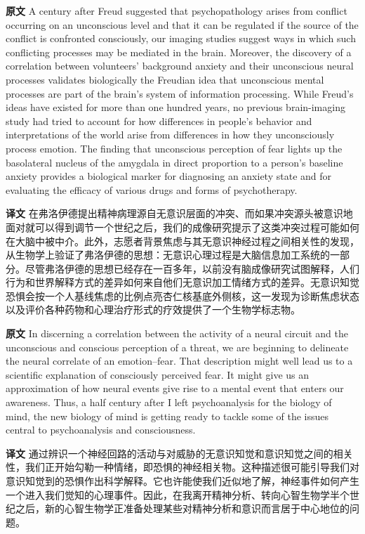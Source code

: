 \documentclass[UTF8]{ctexart}
\newenvironment{english}{\par\small\noindent\textbf{原文}\quad\ignorespaces}{\par}
\newenvironment{zhtranslation}{\par\noindent\textbf{译文}\quad\ignorespaces}{\par\vspace{0.35em}}
\begin{document}
\begin{english}
A century after Freud suggested that psychopathology arises from conflict occurring on an unconscious level and that it can be regulated if the source of the conflict is confronted consciously, our imaging studies suggest ways in which such conflicting processes may be mediated in the brain. Moreover, the discovery of a correlation between volunteers' background anxiety and their unconscious neural processes validates biologically the Freudian idea that unconscious mental processes are part of the brain's system of information processing. While Freud's ideas have existed for more than one hundred years, no previous brain-imaging study had tried to account for how differences in people's behavior and interpretations of the world arise from differences in how they unconsciously process emotion. The finding that unconscious perception of fear lights up the basolateral nucleus of the amygdala in direct proportion to a person's baseline anxiety provides a biological marker for diagnosing an anxiety state and for evaluating the efficacy of various drugs and forms of psychotherapy.
\end{english}
\begin{zhtranslation}
在弗洛伊德提出精神病理源自无意识层面的冲突、而如果冲突源头被意识地面对就可以得到调节一个世纪之后，我们的成像研究提示了这类冲突过程可能如何在大脑中被中介。此外，志愿者背景焦虑与其无意识神经过程之间相关性的发现，从生物学上验证了弗洛伊德的思想：无意识心理过程是大脑信息加工系统的一部分。尽管弗洛伊德的思想已经存在一百多年，以前没有脑成像研究试图解释，人们行为和世界解释方式的差异如何来自他们无意识加工情绪方式的差异。无意识知觉恐惧会按一个人基线焦虑的比例点亮杏仁核基底外侧核，这一发现为诊断焦虑状态以及评价各种药物和心理治疗形式的疗效提供了一个生物学标志物。\end{zhtranslation}

\begin{english}
In discerning a correlation between the activity of a neural circuit and the unconscious and conscious perception of a threat, we are beginning to delineate the neural correlate of an emotion--fear. That description might well lead us to a scientific explanation of consciously perceived fear. It might give us an approximation of how neural events give rise to a mental event that enters our awareness. Thus, a half century after I left psychoanalysis for the biology of mind, the new biology of mind is getting ready to tackle some of the issues central to psychoanalysis and consciousness.
\end{english}
\begin{zhtranslation}
通过辨识一个神经回路的活动与对威胁的无意识知觉和意识知觉之间的相关性，我们正开始勾勒一种情绪，即恐惧的神经相关物。这种描述很可能引导我们对意识知觉到的恐惧作出科学解释。它也许能使我们近似地了解，神经事件如何产生一个进入我们觉知的心理事件。因此，在我离开精神分析、转向心智生物学半个世纪之后，新的心智生物学正准备处理某些对精神分析和意识而言居于中心地位的问题。\end{zhtranslation}
\end{document}
